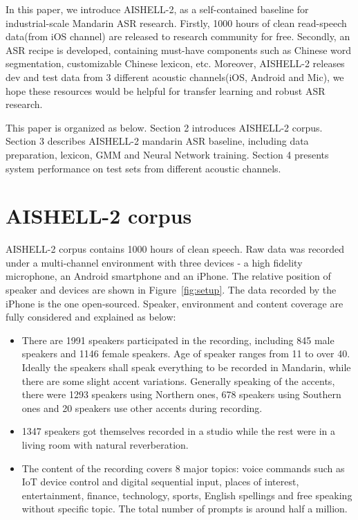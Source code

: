 \documentclass[a4paper]{article}
\begin{document}
In this paper, we introduce AISHELL-2, as a self-contained baseline for industrial-scale Mandarin ASR research. 
Firstly, 1000 hours of clean read-speech data(from iOS channel) are released to research community for free.
Secondly, an ASR recipe is developed, containing must-have components such as Chinese word segmentation, 
customizable Chinese lexicon, etc. 
Moreover, AISHELL-2 releases dev and test data from 3 different acoustic channels(iOS, Android and Mic),
we hope these resources would be helpful for transfer learning and robust ASR research.

This paper is organized as below. Section 2 introduces AISHELL-2 corpus. 
Section 3 describes AISHELL-2 mandarin ASR baseline, including data preparation, lexicon, GMM and Neural Network training.
Section 4 presents system performance on test sets from different acoustic channels.

\section{AISHELL-2 corpus}

AISHELL-2 corpus contains 1000 hours of clean speech. Raw data was recorded under a multi-channel environment with three devices - a high fidelity microphone, an Android smartphone and an iPhone. The relative position of speaker and devices are shown in Figure~\ref{fig:setup}. The data recorded by the iPhone is the one open-sourced. Speaker, environment and content coverage are fully considered and explained as below:
\begin{itemize}
\item There are 1991 speakers participated in the recording, including 845 male speakers and 1146 female speakers. Age of speaker ranges from 11 to over 40. Ideally the speakers shall speak everything to be recorded in Mandarin, while there are some slight accent variations. Generally speaking of the accents, there were 1293 speakers using Northern ones, 678 speakers using Southern ones and 20 speakers use other accents during recording. 
\item 1347 speakers got themselves recorded in a studio while the rest were in a living room with natural reverberation.
\item The content of the recording covers 8 major topics: voice commands such as IoT device control and digital sequential input, places of interest, entertainment, finance, technology, sports, English spellings and free speaking without specific topic. The total number of prompts is around half a million.
\end{itemize}
\end{document}
